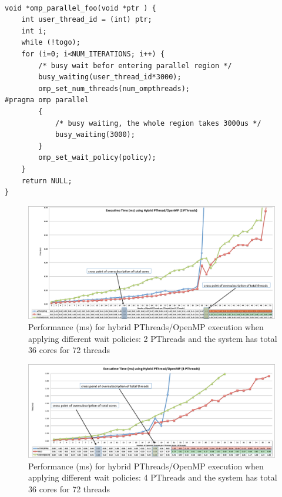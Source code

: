 \lstset{basicstyle=\sffamily\small,language=c, numbersep=1pt}
\begin{lstlisting}[frame=single]  % Start your code-block

void *omp_parallel_foo(void *ptr ) {   
    int user_thread_id = (int) ptr;
    int i;
    while (!togo);
    for (i=0; i<NUM_ITERATIONS; i++) {
        /* busy wait befor entering parallel region */
        busy_waiting(user_thread_id*3000);
        omp_set_num_threads(num_ompthreads);
#pragma omp parallel
        {   
            /* busy waiting, the whole region takes 3000us */
            busy_waiting(3000);
        }
        omp_set_wait_policy(policy);
    }
    return NULL;
}

\end{lstlisting}


\begin{figure}[h]
    \includegraphics[width=0.99\textwidth] {images/2PThread_performance}
    \caption{Performance (ms) for hybrid PThreads/OpenMP execution when applying different wait policies: 2 PThreads and the system has total 36 cores for 72 threads}
    \label{fig:2PThread_performance}
\end{figure}

\begin{figure}[h]
    \includegraphics[width=0.99\textwidth] {images/4PThread_performance}
    \caption{Performance (ms) for hybrid PThreads/OpenMP execution when applying different wait policies: 4 PThreads and the system has total 36 cores for 72 threads}
    \label{fig:4PThread_performance}
\end{figure}

